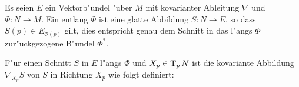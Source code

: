\begin{Dfn}
Es seien $E$ ein Vektorb"undel "uber $M$ mit kovarianter Ableitung $\nabla$ und $\Phi: N \to M$. Ein  entlang $\Phi$ ist eine glatte Abbildung $S: N \to E$, so dass $S(p) \in E_{\Phi(p)}$ gilt, dies entspricht genau dem Schnitt in das l"angs $\Phi$ zur"uckgezogene B"undel $\Phi^*$.
\begin{center}\end{center}
\end{Dfn}
F"ur einen Schnitt $S$ in $E$ l"angs $\Phi$ und $X_p \in \operatorname{T}_pN$ ist die kovariante Abbildung $\nabla_{X_p}S$ von $S$ in Richtung $X_p$ wie folgt definiert:

